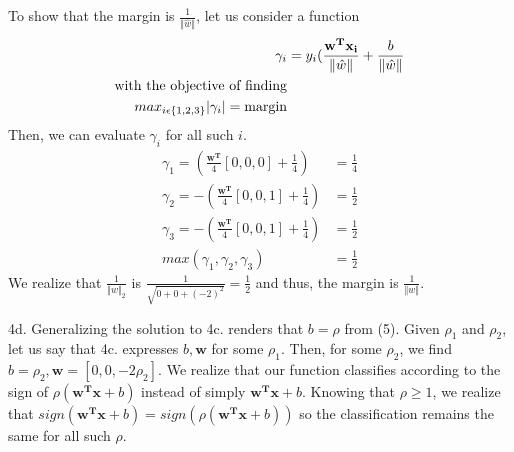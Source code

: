 \documentclass{article}
\begin{document}
To show that the margin is \(\frac{1}{\Vert \hat{w}\Vert}\), let us consider a function
\begin{align*}
  \gamma_i &= y_i(\frac{\mathbf{w^Tx_i}}{\Vert \hat{w}\Vert}+\frac{b}{\Vert \hat{w}\Vert}\\
  \textnormal{with the objective of finding}\\
  max_{i \epsilon \{1,2,3\}} \vert\gamma_i\vert = \textnormal{margin}
\end{align*}
Then, we can evaluate \(\gamma_i\) for all such \(i\).
\begin{align*}
  \gamma_1 = (\frac{\mathbf{w^T}}{4}[0,0,0] + \frac{1}{4}) &= \frac{1}{4}\\
  \gamma_2 = -(\frac{\mathbf{w^T}}{4}[0,0,1] + \frac{1}{4}) &= \frac{1}{2}\\
  \gamma_3 = -(\frac{\mathbf{w^T}}{4}[0,0,1] + \frac{1}{4}) &= \frac{1}{2}\\
  max(\gamma_1, \gamma_2, \gamma_3) &= \frac{1}{2}
\end{align*}
  We realize that \(\frac{1}{\Vert w\Vert_2}\) is
  \(\frac{1}{\sqrt{0+0+(-2)^2}} = \frac{1}{2}\) and thus, the margin is
  \(\frac{1}{\Vert w\Vert}\).

4d.
Generalizing the solution to 4c. renders that \(b = \rho\) from (5). Given \(\rho_1\)
and \(\rho_2\), let us say that 4c. expresses \(b, \mathbf{w}\) for some \(\rho_1\). Then,
for some \(\rho_2\), we find \(b = \rho_2, \mathbf{w} = [0,0,-2\rho_2]\). We realize that
our function classifies according to the sign of \(\rho(\mathbf{w^Tx} + b)\) instead of
simply \(\mathbf{w^Tx} + b\). Knowing that \(\rho \geq 1\), we realize that
\(sign(\mathbf{w^Tx} + b) = sign(\rho(\mathbf{w^Tx} + b))\) so the classification
remains the same for all such \(\rho\).
\end{document}
